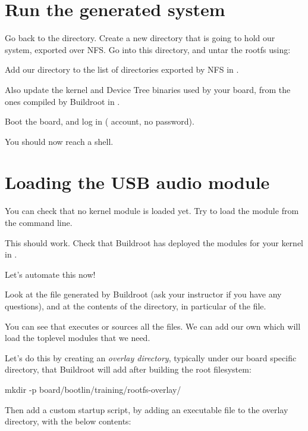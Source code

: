 \section{Run the generated system}

Go back to the  directory. Create
a new  directory that is going to hold our system,
exported over NFS. Go into this directory, and untar the rootfs using:


Add our  directory to the list of directories exported
by NFS in .

Also update the kernel and Device Tree binaries used by your board,
from the ones compiled by Buildroot in .

Boot the board, and log in ( account, no password).

You should now reach a shell.

\section{Loading the USB audio module}

You can check that no kernel module is loaded yet. Try to load the
 module from the command line.

This should work. Check that Buildroot has deployed the modules
for your kernel in .

Let's automate this now!

Look at the  file generated by Buildroot (ask your
instructor if you have any questions), and at the contents of the
 directory, in particular of the  file.

You can see that  executes or sources all the 
files. We can add our own which will load the toplevel modules that we
need.

Let's do this by creating an {\em overlay directory}, typically under
our board specific directory, that Buildroot will add after building the
root filesystem:

\begin{bashinput}
mkdir -p board/bootlin/training/rootfs-overlay/
\end{bashinput}

Then add a custom startup script, by adding an 
executable file to the overlay directory, with the below contents:

